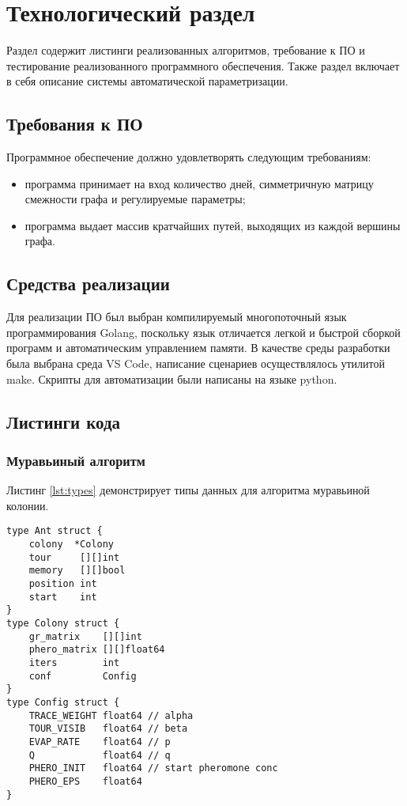 \chapter{Технологический раздел}\label{sec:impl}

Раздел содержит листинги реализованных алгоритмов, требование к ПО и тестирование реализованного программного обеспечения. Также раздел включает в себя описание системы автоматической параметризации.

\section{Требования к ПО}

Программное обеспечение должно удовлетворять следующим требованиям:
\begin{itemize}
	\item программа принимает на вход количество дней, симметричную матрицу смежности графа и регулируемые параметры;
	\item программа выдает массив кратчайших путей, выходящих из каждой вершины графа.
\end{itemize}

\section{Средства реализации} 
Для реализации ПО был выбран компилируемый многопоточный язык программирования Golang, поскольку язык отличается легкой и быстрой сборкой программ и автоматическим управлением памяти.
В качестве среды разработки была выбрана среда VS Code, написание сценариев осуществлялось утилитой make.
Скрипты для автоматизации были написаны на языке python.

\section{Листинги кода}

\subsection{Муравьиный алгоритм}

Листинг \ref{lst:types} демонстрирует типы данных для алгоритма муравьиной колонии.

\captionsetup{singlelinecheck = false, justification=raggedright}
\begin{lstlisting}[label=lst:types,caption=Структуры данных]
type Ant struct {
	colony  *Colony
	tour     [][]int
	memory   [][]bool
	position int
	start    int
}
type Colony struct {
	gr_matrix    [][]int
	phero_matrix [][]float64
	iters        int
	conf         Config
}
type Config struct {
	TRACE_WEIGHT float64 // alpha
	TOUR_VISIB   float64 // beta
	EVAP_RATE    float64 // p
	Q        	 float64 // q
	PHERO_INIT   float64 // start pheromone conc
	PHERO_EPS    float64
}
\end{lstlisting}


